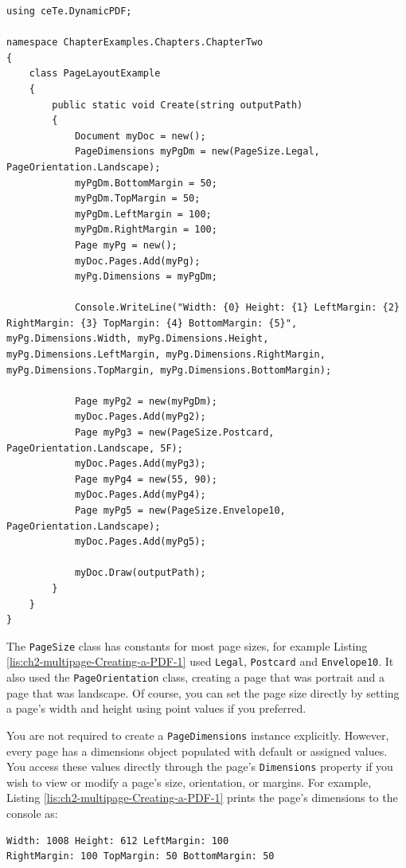 \documentclass[american]{tufte-book}
\numberwithin{equation}{section}
\numberwithin{figure}{section}
\begin{document}
\bgroup{}
\begin{lstlisting}[caption={Creating a PDF with different page sizes.},label={lis:ch2-multipage-Creating-a-PDF-1},basicstyle={\footnotesize\ttfamily},breaklines=true]
using ceTe.DynamicPDF;

namespace ChapterExamples.Chapters.ChapterTwo
{
    class PageLayoutExample
    {
        public static void Create(string outputPath)
        {
            Document myDoc = new();
            PageDimensions myPgDm = new(PageSize.Legal, PageOrientation.Landscape);
            myPgDm.BottomMargin = 50;
            myPgDm.TopMargin = 50;
            myPgDm.LeftMargin = 100;
            myPgDm.RightMargin = 100;
            Page myPg = new();
            myDoc.Pages.Add(myPg);
            myPg.Dimensions = myPgDm;

            Console.WriteLine("Width: {0} Height: {1} LeftMargin: {2} RightMargin: {3} TopMargin: {4} BottomMargin: {5}", myPg.Dimensions.Width, myPg.Dimensions.Height, myPg.Dimensions.LeftMargin, myPg.Dimensions.RightMargin, myPg.Dimensions.TopMargin, myPg.Dimensions.BottomMargin);

            Page myPg2 = new(myPgDm);
            myDoc.Pages.Add(myPg2);
            Page myPg3 = new(PageSize.Postcard, PageOrientation.Landscape, 5F);
            myDoc.Pages.Add(myPg3);
            Page myPg4 = new(55, 90);
            myDoc.Pages.Add(myPg4);
            Page myPg5 = new(PageSize.Envelope10, PageOrientation.Landscape);
            myDoc.Pages.Add(myPg5);
            
            myDoc.Draw(outputPath);
        }
    }
}
\end{lstlisting}
\leavevmode\egroup

The \texttt{PageSize} class has constants for most page sizes, for
example Listing \ref{lis:ch2-multipage-Creating-a-PDF-1} used \texttt{Legal},
\texttt{Postcard} and \texttt{Envelope10}. It also used the \texttt{PageOrientation}
class, creating a page that was portrait and a page that was landscape.
Of course, you can set the page size directly by setting a page's
width and height using point values if you preferred.

You are not required to create a \texttt{PageDimensions} instance
explicitly. However, every page has a dimensions object populated
with default or assigned values. You access these values directly
through the page's \texttt{Dimensions} property if you wish to view
or modify a page's size, orientation, or margins. For example, Listing
\ref{lis:ch2-multipage-Creating-a-PDF-1} prints the page's dimensions to the console as: 
{\ttfamily\bgroup{}
\begin{lstlisting}[basicstyle={\footnotesize\ttfamily},breaklines=true]
Width: 1008 Height: 612 LeftMargin: 100
RightMargin: 100 TopMargin: 50 BottomMargin: 50
\end{lstlisting}
\leavevmode\egroup
}
\end{document}
